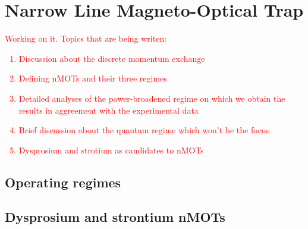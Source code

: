 %
\newpage
\section{Narrow Line Magneto-Optical Trap}
%

\textcolor{red}{Working on it. Topics that are being writen:
\begin{enumerate}
    \item Discussion about the discrete momentum exchange
    \item Defining nMOTs and their three regimes
    \item Detailed analyses of the power-broadened regime on which we obtain the results in aggreement with the experimental data
    \item Brief discussion about the quantum regime which won't be the focus
    \item Dysprosium and strotium as candidates to nMOTs
\end{enumerate}
}

\subsection{Operating regimes}
\label{sec:nMOT-operating-regimes}

\subsection{Dysprosium and strontium nMOTs}
\label{sec:nMOT-operating-regimes}
